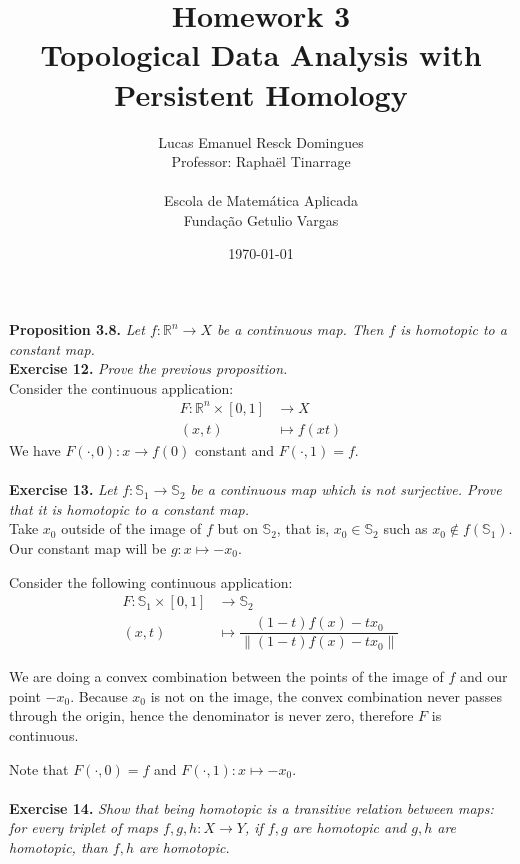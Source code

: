 \documentclass{article}
\title{Homework 3\\
    \large{Topological Data Analysis with Persistent Homology}}
\author{Lucas Emanuel Resck Domingues\\    
    Professor: Raphaël Tinarrage\\\\
    {Escola de Matemática Aplicada}\\
    {Fundação Getulio Vargas}}
\date{\today}
\begin{document}
    \maketitle

    \noindent\textbf{Proposition 3.8.} \textit{Let $f \colon    \mathbb{R}^n \to X$ be a continuous map.
    Then $f$ is homotopic to a constant map.} \\

    \noindent\textbf{Exercise 12.} \textit{Prove the previous proposition.} \\

    Consider the continuous application:
    \begin{align*}
        F \colon \mathbb{R}^n \times [0, 1] &\longrightarrow X \\
        (x, t) &\longmapsto f(xt)
    \end{align*}
    We have $F(\cdot, 0) \colon x \to f(0)$ constant and $F(\cdot, 1) = f$. \\ \\

    \noindent\textbf{Exercise 13.} \textit{Let $f \colon \mathbb{S}_1 \to \mathbb{S}_2$ be a continuous map which is not surjective.
    Prove that it is homotopic to a constant map.} \\

    Take $x_0$ outside of the image of $f$ but on $\mathbb{S}_2$, that is, $x_0 \in \mathbb{S}_2$ such as $x_0 \notin f(\mathbb{S}_1)$.
    Our constant map will be $g \colon x \mapsto -x_0$.

    Consider the following continuous application:
    \begin{align*}
        F \colon \mathbb{S}_1 \times [0, 1] &\longrightarrow \mathbb{S}_2 \\
        (x, t) &\longmapsto \dfrac{(1-t) f(x) - t x_0}{\lVert (1-t) f(x) - t x_0 \lVert}
    \end{align*}

    We are doing a convex combination between the points of the image of $f$ and our point $-x_0$. Because $x_0$ is not on the image, the convex combination never passes through the origin, hence the denominator is never zero, therefore $F$ is continuous.

    Note that $F(\cdot, 0) = f$ and $F(\cdot, 1) \colon x \mapsto -x_0$. \\\\

    \noindent\textbf{Exercise 14.} \textit{Show that being homotopic is a transitive relation between maps:
    for every triplet of maps $f, g, h \colon X \to Y$, if $f, g$ are homotopic and $g, h$ are homotopic, than $f, h$ are homotopic.} \\
\end{document}

